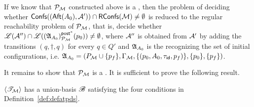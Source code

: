 

If we know that ${\mathcal{P} }_{\mathcal{M} }$ constructed above is a {\WOTrPDS}, then the problem of deciding whether ${\mathsf{Confs} }(({\sf Aft}(A_0), {\mathcal{A} }')) \cap \mathsf{RConfs}({\mathcal{M} }) \neq \emptyset$ is reduced to the regular reachability problem of ${\mathcal{P} }_{\mathcal{M} }$, that is, decide whether ${\mathscr{L} }({\mathcal{A} }'')  \cap {\mathscr{L} }(({\mathfrak{A} }_{A_0})^{{\mathsf{post} }^*}_{{\mathcal{P} }_{{\mathcal{M} }}}(p_0)) \neq \emptyset$, where ${\mathcal{A} }''$ is obtained from ${\mathcal{A} }'$ by adding the transitions $(q, \dag, q)$ for every $q \in Q'$ and ${\mathfrak{A} }_{A_0}$ is the {\WOTrNFA} recognizing the set of initial configurations, i.e. ${\mathfrak{A} }_{A_0} = (P_{\mathcal{M} } \cup \{p_f\}, \Gamma_{{\mathcal{M} }}, \{(p_0, A_0, \tau_{\mathsf{id}}, p_f)\}, \{p_0\}, \{p_f\})$. 



It remains to show that ${\mathcal{P} }_{\mathcal{M} }$ is a {\WOTrPDS}. It is sufficient to prove the following result. 

\begin{proposition}\label{lem-transet-wo}
$\langle {\mathscr{T} }_{\mathcal{M} } \rangle$ has a union-basis ${\mathscr{B} }$ satisfying the four conditions in Definition~\ref{def:defatpds}.
\end{proposition}



